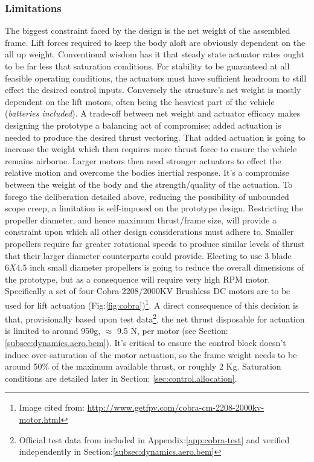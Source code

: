 \subsubsection{Limitations}
\label{subsubsec:intro.foreword.limits}
The biggest constraint faced by the design is the net weight of the assembled frame. Lift forces required to keep the body aloft are obviously dependent on the all up weight. Conventional wisdom has it that steady state actuator rates ought to be far less that saturation conditions. For stability to be guaranteed at all feasible operating conditions, the actuators must have sufficient headroom to still effect the desired control inputs. Conversely the structure's net weight is mostly dependent on the lift motors, often being the heaviest part of the vehicle (\emph{batteries included}). A trade-off between net weight and actuator efficacy makes designing the prototype a balancing act of compromise; added actuation is needed to produce the desired thrust vectoring. That added actuation is going to increase the weight which then requires more thrust force to ensure the vehicle remains airborne. Larger motors then need stronger actuators to effect the relative motion and overcome the bodies inertial response. It's a compromise between the weight of the body and the strength/quality of the actuation.
\newpage
To forego the deliberation detailed above, reducing the possibility of unbounded scope creep, a limitation is self-imposed on the prototype design. Restricting the propeller diameter, and hence maximum thrust/frame size, will provide a constraint upon which all other design considerations must adhere to. Smaller propellers require far greater rotational speeds to produce similar levels of thrust that their larger diameter counterparts could provide. Electing to use 3 blade $6X4.5$ inch small diameter propellers is going to reduce the overall dimensions of the prototype, but as a consequence will require very high RPM motor. Specifically a set of four Cobra-2208/2000KV\cite{cobramotor} Brushless DC motors are to be used for lift actuation (Fig:\ref{fig:cobra})\footnote{Image cited from: \url{http://www.getfpv.com/cobra-cm-2208-2000kv-motor.html}}. A direct consequence of this decision is that, provisionally based upon test data\footnote{Official test data from\cite{cobramotor} included in Appendix:\ref{app:cobra-test} and verified independently in Section:\ref{subsec:dynamics.aero.bem}}, the net thrust disposable for actuation is limited to around 950g, $\approx$ 9.5 N, per motor (see Section:\ref{subsec:dynamics.aero.bem}). It's critical to ensure the control block doesn't induce over-saturation of the motor actuation, so the frame weight needs to be around 50\% of the maximum available thrust, or roughly 2 Kg. Saturation conditions are detailed later in Section: \ref{sec:control.allocation}.
